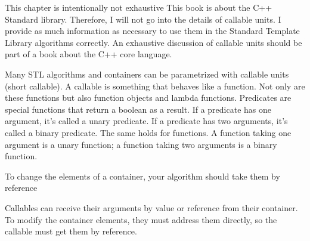 

\begin{myNotic}{This chapter is intentionally not exhaustive}
This book is about the C++ Standard library. Therefore, I will not go into the details of callable units. I provide as much information as necessary to use them in the Standard Template Library algorithms correctly. An exhaustive discussion of callable units should be part of a book about the C++ core language.
\end{myNotic}

Many STL algorithms and containers can be parametrized with callable units (short callable). A callable is something that behaves like a function. Not only are these functions but also function objects and lambda functions. Predicates are special functions that return a boolean as a result. If a predicate has one argument, it’s called a unary predicate. If a predicate has two arguments, it’s called a binary predicate. The same holds for functions. A function taking one argument is a unary function; a function taking two arguments is a binary function.

\begin{myTip}{To change the elements of a container, your algorithm should take them by reference}
	
Callables can receive their arguments by value or reference from their container. To modify the container elements, they must address them directly, so the callable must get them by reference.
\end{myTip}